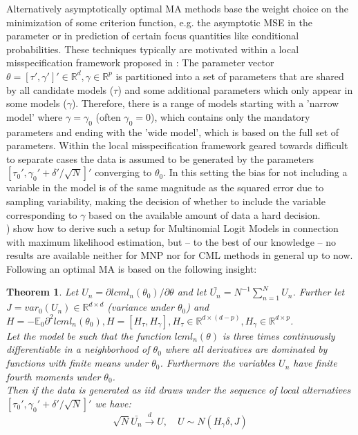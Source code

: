 \documentclass[12pt, a4paper]{article}
\newtheorem{theorem}{Theorem}[section]
\numberwithin{defcounter}{section}
\numberwithin{excounter}{section}
\begin{document}
Alternatively asymptotically optimal \ac{MA} methods base the weight choice on the minimization of some criterion function, e.g. the asymptotic \ac{MSE} in the parameter or in prediction of certain focus quantities like conditional probabilities. These techniques typically are motivated within 
a local misspecification framework proposed in \cite{hjort2003}: 
The parameter vector $\theta = [\tau',\gamma']' \in {\mathbb R}^d, \gamma \in {\mathbb R}^p$ is partitioned into a set of parameters that are shared by all candidate models ($\tau$) and some additional parameters which only appear in some models ($\gamma$). Therefore, there is a range of models starting with a 'narrow model' where 
$\gamma = \gamma_0$ (often $\gamma_0=0$), which contains only the mandatory parameters and ending 
with the 'wide model', which is based on the full set of parameters. Within the local misspecification framework geared towards difficult to separate cases the data is assumed to be generated by the parameters $[\tau_0',\gamma_0' + \delta'/\sqrt{N}]'$ converging to $\theta_0$. In this setting the bias for not including a variable in the model is of the same magnitude as the squared error due to sampling variability, making the decision of whether to include the variable corresponding to $\gamma$ based on the available amount of data a hard decision. 
\\
\cite{wan2014}) show how to derive such a setup for Multinomial Logit Models in connection with maximum likelihood estimation, but  -- to the best of our knowledge -- no results are available neither for \ac{MNP} nor for \ac{CML} methods in general up to now.\\
Following \cite{hjort2003} an optimal \ac{MA} is based on the following insight:  

\begin{theorem} \label{thm:score}
Let $U_n = \partial lcml_n(\theta_0)/\partial \theta$
and let $\bar{U_n} = N^{-1} \sum_{n=1}^N U_n$. 
Further let $J = var_0(U_n) \in {\mathbb R}^{d \times d}$ (variance under $\theta_0$) and $H = -\mathbb{E}_0 \partial^2 lcml_n(\theta_0), H = [H_\tau,H_\gamma], H_\tau \in {\mathbb R}^{d \times (d-p)}, H_\gamma \in {\mathbb R}^{d \times p}$. 
\\
Let the model be such that the function $lcml_n(\theta)$ is three times continuously differentiable in a 
neighborhood of $\theta_0$ where all derivatives are dominated by functions with finite means under 
$\theta_0$. Furthermore the variables $U_n$ have finite fourth moments under $\theta_0$. 
\\
Then if the data is generated as iid draws under the sequence of local alternatives $[\tau_0',\gamma_0' + \delta'/\sqrt{N}]'$ we have:
%
\begin{equation} \label{equ:asyScore} 
\sqrt{N} \bar{U_n} \stackrel{d}{\to} U, \quad U \sim N(H_\gamma \delta, J)
\end{equation}
\end{theorem}
\end{document}
